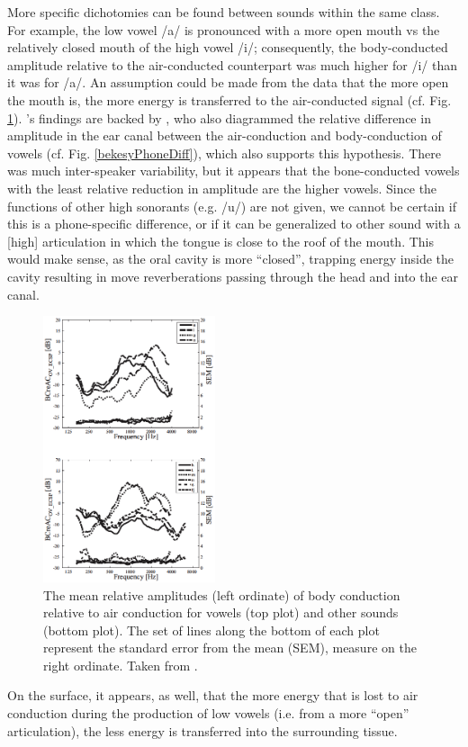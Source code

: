 \documentclass[dissertation,copyright]{uathesis}
\begin{document}
More specific dichotomies can be found between sounds within the same class. For example, the low vowel /a/ is pronounced with a more open mouth vs the relatively closed mouth of the high vowel /i/; consequently, the body-conducted amplitude relative to the air-conducted counterpart was much higher for /i/ than it was for /a/. An assumption could be made from the data that the more open the mouth is, the more energy is transferred to the air-conducted signal (cf. Fig. \ref{BCrelACall}). \cite{reinfeldt:10}'s findings are backed by \cite{bekesy:60}, who also diagrammed the relative difference in amplitude in the ear canal between the air-conduction and body-conduction of vowels (cf. Fig. \ref{bekesyPhoneDiff}), which also supports this hypothesis.  There was much inter-speaker variability, but it appears that the bone-conducted vowels with the least relative reduction in amplitude are the higher vowels.  Since the functions of other high sonorants (e.g. /u/) are not given, we cannot be certain if this is a phone-specific difference, or if it can be generalized to other sound with a [high] articulation in which the tongue is close to the roof of the mouth.  This would make sense, as the oral cavity is more ``closed'', trapping energy inside the cavity resulting in move reverberations passing through the head and into the ear canal.
%
\begin{figure}
\includegraphics[width=0.45\textwidth]{figure/BC_rel_AC_all.png}
\caption{The mean relative amplitudes (left ordinate) of body conduction relative to air conduction for vowels (top plot) and other sounds (bottom plot).  The set of lines along the bottom of each plot represent the standard error from the mean (SEM), measure on the right ordinate.  Taken from \cite{reinfeldt:10}.}
\label{BCrelACall}
\end{figure}
%
On the surface, it appears, as well, that the more energy that is lost to air conduction during the production of low vowels (i.e. from a more ``open'' articulation), the less energy is transferred into the surrounding tissue.
\end{document}
